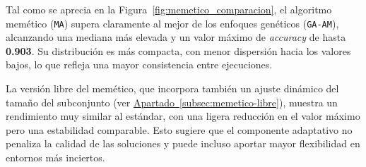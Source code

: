 Tal como se aprecia en la Figura~\ref{fig:memetico_comparacion}, el algoritmo memético (\texttt{MA}) supera claramente al mejor de los enfoques genéticos
(\texttt{GA-AM}), alcanzando una mediana más elevada y un valor máximo de \textit{accuracy} de hasta \textbf{0.903}.
Su distribución es más compacta, con menor dispersión hacia los valores bajos, lo que refleja una mayor consistencia entre ejecuciones.

La versión libre del memético, que incorpora también un ajuste dinámico del tamaño del subconjunto
(ver \hyperref[subsec:memetico-libre]{Apartado~\ref*{subsec:memetico-libre}}), muestra un rendimiento muy similar al estándar,
con una ligera reducción en el valor máximo pero una estabilidad comparable.
Esto sugiere que el componente adaptativo no penaliza la calidad de las soluciones y puede incluso aportar mayor flexibilidad en entornos más inciertos.


